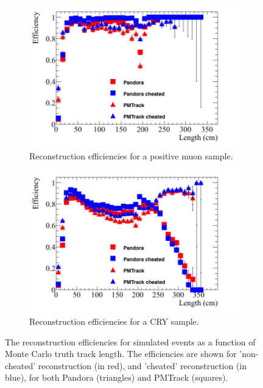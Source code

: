 \begin{figure}[h!]
  \centering
  \begin{subfigure}{0.48\textwidth}
    \centering
    \includegraphics[width=\textwidth]{Effic_AntiMuon_500V_All_Length}
    \caption{Reconstruction efficiencies for a positive muon sample.}
    \label{fig:SimEffic_Length_AMu}
  \end{subfigure}%
  \hspace{0.03\textwidth}%
  \begin{subfigure}{0.48\textwidth}
    \centering
    \includegraphics[width=\textwidth]{Effic_Cosmics_500V_All_Length}
    \caption{Reconstruction efficiencies for a CRY sample.}
    \label{fig:SimEffic_Length_CRY}
  \end{subfigure}
  \caption[The reconstruction efficiencies for simulated events as a function of Monte Carlo truth track length.]
          {The reconstruction efficiencies for simulated events as a function of Monte Carlo truth track length. The efficiencies are shown for 'non-cheated' reconstruction (in red), and 'cheated' reconstruction (in blue), for both Pandora (triangles) and PMTrack (squares).}
          \label{fig:SimEffic_Length}
\end{figure}

